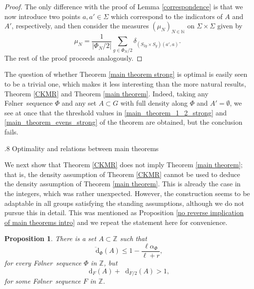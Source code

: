 \documentclass[reqno]{amsart}
\makeatletter
\def\Z{{\mathbb Z}}
\def\N{{\mathbb N}}
\newcommand*\diff{\mathop{}\!\mathrm{d}}
\newtheorem{proposition}[theorem]{Proposition}
\theoremstyle{definition}
\theoremstyle{remark}
\def\section{\@startsection{section}{1}%
  \z@{.5\linespacing\@plus.7\linespacing}
{.8\baselineskip}%
  {\normalfont\fontsize{11}{13}\centering\bfseries}%
}
\theoremstyle{remark}
\def\N{{\mathbb N}}
\newcommand{\Folner}{F\o{}lner}
\makeatother
\begin{document}
\begin{proof}
The only difference with the proof of Lemma \ref{correspondence} is that we now introduce two points $a,a'\in \Sigma$ which correspond to the indicators of $A$ and $A'$, respectively, and then consider the measures 
$(\mu_N)_{N\in \N}$ on 
$\Sigma\times\Sigma$ given by 
$$\mu_N = \frac{1}{|\Phi_{N}/2|}\sum_{g\in \Phi_{N}/2}\delta_{(S_{2g}\times S_g)(a',a)}.$$
The rest of the proof proceeds analogously. 
\end{proof}

The question of whether Theorem \ref{main theorem strong} is 
optimal is easily seen to be a trivial one, which makes it 
less interesting than the more natural results, Theorem \ref{CKMR} and Theorem 
\ref{main theorem}. Indeed, taking any \Folner\ sequence $\Phi$ and any set $A\subset G$ with full 
density along $\Phi$ and $A'=\emptyset$, we see at once that 
the threshold values in \eqref{main_theorem_1_2_strong} and \eqref{main_theorem_evens_strong} of 
the theorem are obtained, but the 
conclusion fails. 

\section{Optimality and relations between main theorems}\label{optimality sec}


We next show that Theorem \ref{CKMR} does not imply Theorem 
\ref{main theorem}; that is, the density assumption of Theorem
\ref{CKMR} cannot be used to deduce the density assumption of 
Theorem \ref{main theorem}. This is already the case in the 
integers, which was rather unexpected. However, the 
construction seems to be adaptable in all groups satisfying 
the standing assumptions, although we do not pursue this in 
detail. This was mentioned as Proposition \ref{no reverse implication of main theorems intro} and we repeat the statement here for convenience.    

\begin{proposition}\label{no reverse implication of main theorems}
There is a set 
$A\subset \Z$ such that 
$$\overline{\diff}_{\Phi}(A) \leq 1-\frac{\ell \alpha_{\Phi}}{\ell+r},$$
for every \Folner\ sequence $\Phi$ in $\Z$, but 
$$\diff_{F}(A)+\diff_{F/2}(A)>1, $$
for some \Folner\ sequence $F$ in $\Z$.
\end{proposition}
\end{document}
